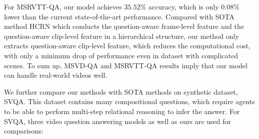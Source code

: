 \documentclass[journal]{IEEEtran}
\begin{document}
\begin{table*}[t]
    \centering
    \caption{Performance comparison to the state-of-the-art methods on SVQA.}
    \label{tab:SoTASVQA}
\end{table*}
For MSRVTT-QA, our model achieves $35.52\%$ accuracy, which is only $0.08\%$ lower than the current state-of-the-art performance. Compared with SOTA method HCRN which conducts the question-aware frame-level feature and the question-aware clip-level feature in a hierarchical structure, our method only extracts question-aware clip-level feature, which reduces the computational cost, with only a minimum drop of performance even in dataset with complicated scenes. To sum up, MSVD-QA and MSRVTT-QA results imply that our model can handle real-world videos well.

We further compare our methods with SOTA methods on synthetic dataset, SVQA. This dataset contains many compositional questions, which require agents to be able to perform multi-step relational reasoning to infer the answer. For SVQA, three video question answering models as well as ours are used for comparisons:
\end{document}
